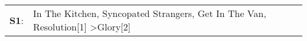 \begin{supertabular}{p{0.03\textwidth}p{0.92\textwidth}}
 \textbf{S1}:  &  In The Kitchen\textsuperscript{}, \enspace Syncopated Strangers\textsuperscript{}, \enspace Get In The Van\textsuperscript{}, \enspace Resolution[1]\textsuperscript{} \textgreater \enspace Glory[2]\textsuperscript{}  \enspace  \\
\end{supertabular}
